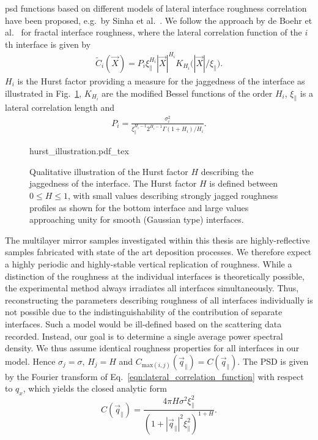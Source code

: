 \Gls{psd} functions based on different models of lateral interface roughness correlation have been proposed, e.g.~by Sinha et al.~\cite{sinha_x-ray_1988}. We follow the approach by de Boehr et al.~\cite{boer_influence_1994,de_boer_x-ray_1995} for fractal interface roughness, where the lateral correlation function of the $i$th interface is given by
\begin{align}
\tilde{C}_i(\vec{X}) = P_i \xi_\parallel^{H_i} |\vec{X}|^{H_i} K_{H_i}\Big(|\vec{X}|/\xi_\parallel\Big) \text{.} \label{eqn:lateral_correlation_function}
\end{align}
$H_i$ is the Hurst factor providing a measure for the jaggedness of the interface \cite{sinha_x-ray_1988} as illustrated in Fig.~\ref{ch_theo:fig_hurst_illustration}, $K_{H_i}$ are the modified Bessel functions of the order $H_i$, $\xi_\parallel$ is a lateral correlation length and
\begin{align}
P_i = \frac{\sigma_i^2}{\xi_\parallel^{H_i-1} 2^{H_i-1} \Gamma(1+H_i)/H_i}\text{.}
\end{align}
\begin{figure}[htb]
    \def\svgwidth{0.5\textwidth}
    {hurst_illustration.pdf_tex}
    \caption[Qualitative illustration of the Hurst factor.]{Qualitative illustration of the Hurst factor $H$ describing the jaggedness of the interface. The Hurst factor $H$ is defined between $0 \leq H \leq 1$, with small values describing strongly jagged roughness profiles as shown for the bottom interface and large values approaching unity for smooth (Gaussian type) interfaces.}
    \label{ch_theo:fig_hurst_illustration}
\end{figure}

The multilayer mirror samples investigated within this thesis are highly-reflective samples fabricated with state of the art deposition processes. We therefore expect a highly periodic and highly-stable vertical replication of roughness. While a distinction of the roughness at the individual interfaces is theoretically possible, the experimental method always irradiates all interfaces simultaneously. Thus, reconstructing the parameters describing roughness of all interfaces individually is not possible due to the indistinguishability of the contribution of separate interfaces. Such a model would be ill-defined based on the scattering data recorded. Instead, our goal is to determine a single average power spectral density. We thus assume identical roughness properties for all interfaces in our model. Hence $\sigma_j = \sigma$, $H_j = H$ and $C_{\text{max}(i,j)}(\vec{q}_\parallel) = C(\vec{q}_\parallel)$. The PSD is given by the Fourier transform of Eq.~\eqref{eqn:lateral_correlation_function} with respect to $q_x$, which yields the closed analytic form
\begin{equation}
        C(\vec{q}_\parallel) = \frac{4 \pi H \sigma^2 \xi_\parallel^2}{(1+|\vec{q}_\parallel|^2\xi_\parallel^2)^{1+H}} \text{.} \label{ch_theo:eqn_psd} 
\end{equation}

